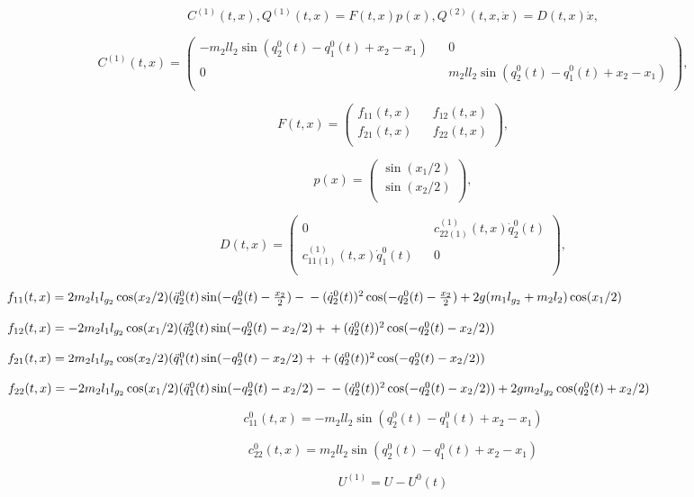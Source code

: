 $$ C^{(1)}(t,x), Q^{(1)}(t,x)=F(t,x)p(x), Q^{(2)}(t,x,\dot x)=D(t,x)\dot x, $$

$$ C^{(1)}(t, x) =
\begin{pmatrix}
- m_2 l l_2 \sin(q_2^0(t) - q_1^0(t) + x_2 - x_1) && 0 \\
0 && m_2 l l_2 \sin(q_2^0(t) - q_1^0(t) + x_2 - x_1) \\
\end{pmatrix}, $$

$$F(t, x) =
\begin{pmatrix}
f_{11}(t,x) && f_{12}(t,x) \\
f_{21}(t,x) && f_{22}(t,x)\\
\end{pmatrix},$$

$$p(x) =
\begin{pmatrix}
\sin(x_1/2) \\
\sin(x_2/2)\\
\end{pmatrix},$$

$$D(t, x) =
\begin{pmatrix}
0 && c_{22(1)}^{(1)}(t,x) \dot q_2^0(t) \\
c_{11(1)}^{(1)}(t,x) \dot q_1^0(t) && 0 \\
\end{pmatrix},$$

$f_{11}(t,x) = 2m_2l_1l_{g_2} \cos(x_2/2) (\ddot q_2^0(t) \sin(- q_2^0(t) - \frac{x_2}{2}) - \\ - (\dot q_2^0(t))^2 \cos(- q_2^0(t) - \frac{x_2}{2}) + 2g(m_1 l_{g_2} + m_2 l_2) \cos(x_1/2)$

$f_{12}(t,x) = - 2 m_2 l_1 l_{g_2} \cos(x_1/2) (\ddot q_2^0(t) \sin(- q_2^0(t) - x_2/2) + \\ + (\dot q_2^0(t))^2 \cos(- q_2^0(t) - x_2/2))$

$f_{21}(t,x) = 2 m_2 l_1 l_{g_2} \cos(x_2/2) (\ddot q_1^0(t) \sin(- q_2^0(t) - x_2/2) + \\ + (\dot q_2^0(t))^2 \cos(- q_2^0(t) - x_2/2))$

$f_{22}(t,x) = - 2m_2 l_1 l_{g_2} \cos(x_1/2) (\ddot q_1^0(t) \sin(- q_2^0(t) - x_2/2) - \\ - (\dot q_2^0(t))^2 \cos(- q_2^0(t) - x_2/2)) + 2 g m_2 l_{g_2} \cos(q_2^0(t) + x_2/2)$

$$ c_11^0(t, x) = - m_2 l l_2 \sin(q_2^0(t) - q_1^0(t) + x_2 - x_1) $$

$$ c_22^0(t, x) = m_2 l l_2 \sin(q_2^0(t) - q_1^0(t) + x_2 - x_1) $$

$$ U^{(1)} = U - U^{0}(t) $$

